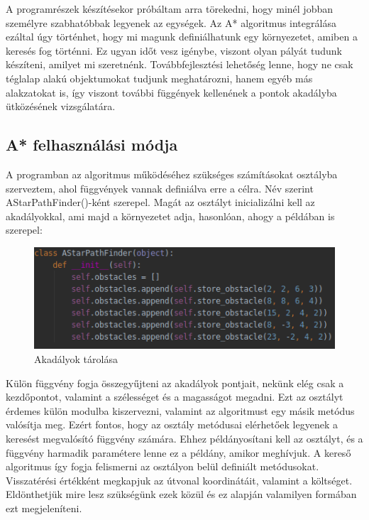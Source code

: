 

A programrészek készítésekor próbáltam arra törekedni, hogy minél jobban személyre szabhatóbbak legyenek az egységek. Az A* algoritmus integrálása ezáltal úgy történhet, hogy mi magunk definiálhatunk egy környezetet, amiben a keresés fog történni. Ez ugyan időt vesz igénybe, viszont olyan pályát tudunk készíteni, amilyet mi szeretnénk. Továbbfejlesztési lehetőség lenne, hogy ne csak téglalap alakú objektumokat tudjunk meghatározni, hanem egyéb más alakzatokat is, így viszont további függények kellenének a pontok akadályba ütközésének vizsgálatára.

\subsection{A* felhasználási módja}

A programban az algoritmus működéséhez szükséges számításokat osztályba szerveztem, ahol függvények vannak definiálva erre a célra. Név szerint AStarPathFinder()-ként szerepel. Magát az osztályt inicializálni kell az akadályokkal, ami majd a környezetet adja, hasonlóan, ahogy a példában is szerepel:

\begin{figure}[h!]
\centering
\includegraphics[scale=0.75]{images/store_obstacles.png}
\caption{Akadályok tárolása}
\label{fig:store_obstacles}
\end{figure}

Külön függvény fogja összegyűjteni az akadályok pontjait, nekünk elég csak a kezdőpontot, valamint a szélességet és a magasságot megadni. Ezt az osztályt érdemes külön modulba kiszervezni, valamint az algoritmust egy másik metódus valósítja meg. Ezért fontos, hogy az osztály metódusai elérhetőek legyenek a keresést megvalósító függvény számára. Ehhez példányosítani kell az osztályt, és a függvény harmadik paramétere lenne ez a példány, amikor meghívjuk. A kereső algoritmus így fogja felismerni az osztályon belül definiált metódusokat. Visszatérési értékként megkapjuk az útvonal koordinátáit, valamint a költséget. Eldönthetjük mire lesz szükségünk ezek közül és ez alapján valamilyen formában ezt megjeleníteni.

